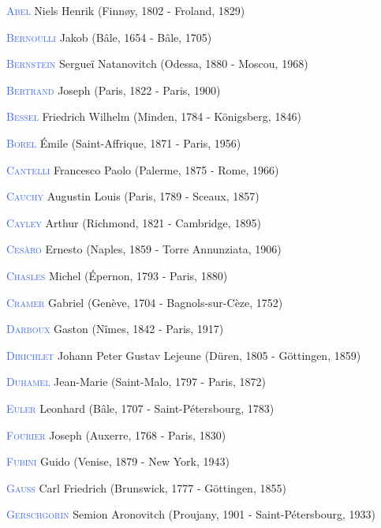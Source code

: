 \item \textcolor{RoyalBlue}{\textsc{Abel}} Niels Henrik (Finnøy, 1802 - Froland, 1829)
\item \textcolor{RoyalBlue}{\textsc{Bernoulli}} Jakob (Bâle, 1654 - Bâle, 1705)
\item \textcolor{RoyalBlue}{\textsc{Bernstein}} Sergueï Natanovitch (Odessa, 1880 - Moscou, 1968)
\item \textcolor{RoyalBlue}{\textsc{Bertrand}} Joseph (Paris, 1822 - Paris, 1900)
\item \textcolor{RoyalBlue}{\textsc{Bessel}} Friedrich Wilhelm (Minden, 1784 - Königsberg, 1846)
\item \textcolor{RoyalBlue}{\textsc{Borel}} Émile (Saint-Affrique, 1871 - Paris, 1956)
\item \textcolor{RoyalBlue}{\textsc{Cantelli}} Francesco Paolo (Palerme, 1875 - Rome, 1966)
\item \textcolor{RoyalBlue}{\textsc{Cauchy}} Augustin Louis (Paris, 1789 - Sceaux, 1857)
\item \textcolor{RoyalBlue}{\textsc{Cayley}} Arthur (Richmond, 1821 - Cambridge, 1895)
\item \textcolor{RoyalBlue}{\textsc{Cesàro}} Ernesto (Naples, 1859 - Torre Annunziata, 1906)
\item \textcolor{RoyalBlue}{\textsc{Chasles}} Michel (Épernon, 1793 - Paris, 1880)
\item \textcolor{RoyalBlue}{\textsc{Cramer}} Gabriel (Genève, 1704 - Bagnols-sur-Cèze, 1752)
\item \textcolor{RoyalBlue}{\textsc{Darboux}} Gaston (Nîmes, 1842 - Paris, 1917)
\item \textcolor{RoyalBlue}{\textsc{Dirichlet}} Johann Peter Gustav Lejeune (Düren, 1805 - Göttingen, 1859)
\item \textcolor{RoyalBlue}{\textsc{Duhamel}} Jean-Marie (Saint-Malo, 1797 - Paris, 1872)
\item \textcolor{RoyalBlue}{\textsc{Euler}} Leonhard (Bâle, 1707 -  Saint-Pétersbourg, 1783)
\item \textcolor{RoyalBlue}{\textsc{Fourier}} Joseph (Auxerre, 1768 - Paris, 1830)
\item \textcolor{RoyalBlue}{\textsc{Fubini}} Guido (Venise, 1879 - New York, 1943)
\item \textcolor{RoyalBlue}{\textsc{Gauss}} Carl Friedrich (Brunswick, 1777 - Göttingen, 1855)
\item \textcolor{RoyalBlue}{\textsc{Gerschgorin}} Semion Aronovitch (Proujany, 1901 - Saint-Pétersbourg, 1933)
